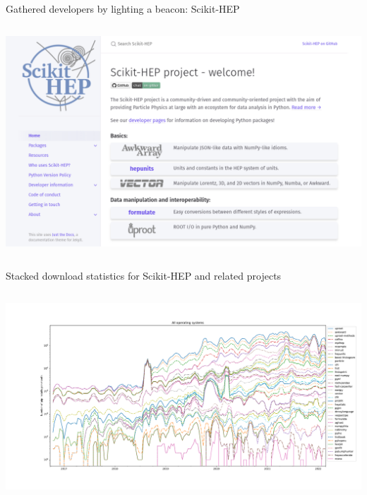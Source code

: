 \documentclass[aspectratio=169]{beamer}
\begin{document}
\begin{frame}{Gathered developers by lighting a beacon: Scikit-HEP}
\vspace{0.18 cm}
\begin{columns}
\includegraphics[width=\linewidth]{scikit-hep-webpage.png}
\end{columns}
\end{frame}

\begin{frame}{Stacked download statistics for Scikit-HEP and related projects}
\begin{columns}
\includegraphics[width=\linewidth]{pip-allos-scikithep-log.pdf}
\end{columns}
\end{frame}
\end{document}
